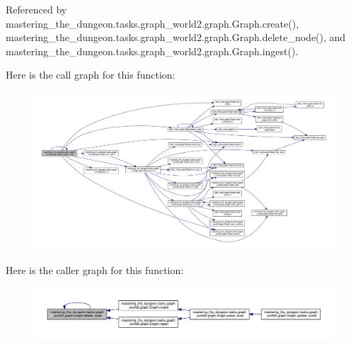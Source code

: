 Referenced by mastering\+\_\+the\+\_\+dungeon.\+tasks.\+graph\+\_\+world2.\+graph.\+Graph.\+create(), mastering\+\_\+the\+\_\+dungeon.\+tasks.\+graph\+\_\+world2.\+graph.\+Graph.\+delete\+\_\+node(), and mastering\+\_\+the\+\_\+dungeon.\+tasks.\+graph\+\_\+world2.\+graph.\+Graph.\+ingest().

Here is the call graph for this function\+:
\nopagebreak
\begin{figure}[H]
\begin{center}
\leavevmode
\includegraphics[width=350pt]{classmastering__the__dungeon_1_1tasks_1_1graph__world2_1_1graph_1_1Graph_a23edd3bef3ed5565ef4708f4a7ea1d38_cgraph}
\end{center}
\end{figure}
Here is the caller graph for this function\+:
\nopagebreak
\begin{figure}[H]
\begin{center}
\leavevmode
\includegraphics[width=350pt]{classmastering__the__dungeon_1_1tasks_1_1graph__world2_1_1graph_1_1Graph_a23edd3bef3ed5565ef4708f4a7ea1d38_icgraph}
\end{center}
\end{figure}
\mbox{\label{classmastering__the__dungeon_1_1tasks_1_1graph__world2_1_1graph_1_1Graph_ad405f84dd86a57f96f730fbc523c2e5e}} 
